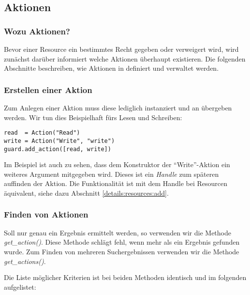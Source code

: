 \subsection{Aktionen}
\subsubsection{Wozu Aktionen?}

Bevor einer Resource ein bestimmtes Recht gegeben oder verweigert wird, wird 
\product zunächst darüber informiert welche Aktionen überhaupt 
existieren. Die folgenden Abschnitte beschreiben, wie Aktionen in \product 
definiert und verwaltet werden.

\subsubsection{Erstellen einer Aktion}

Zum Anlegen einer Aktion muss diese lediglich instanziert und an \product 
übergeben werden. Wir tun dies Beispielhaft fürs Lesen und Schreiben:

\begin{lstlisting}
read  = Action("Read")
write = Action("Write", "write")
guard.add_action([read, write])
\end{lstlisting}

Im Beispiel ist auch zu sehen, dass dem Konstruktor der ``Write''-Aktion 
ein weiteres Argument mitgegeben wird. Dieses ist ein {\it Handle} zum 
späteren auffinden der Aktion. Die Funktionalität ist mit dem Handle bei 
Resourcen äquivalent, siehe dazu Abschnitt \ref{details:resources:add}.


\subsubsection{\label{details:actions:find}Finden von Aktionen}

Soll nur genau ein Ergebnis ermittelt werden, so verwenden wir die Methode 
{\it get\_action()}. Diese Methode schlägt fehl, wenn mehr als ein Ergebnis 
gefunden wurde. Zum Finden von mehreren Suchergebnissen verwenden wir die 
Methode {\it get\_actions()}.

Die Liste möglicher Kriterien ist bei beiden Methoden identisch und im 
folgenden aufgelistet:

